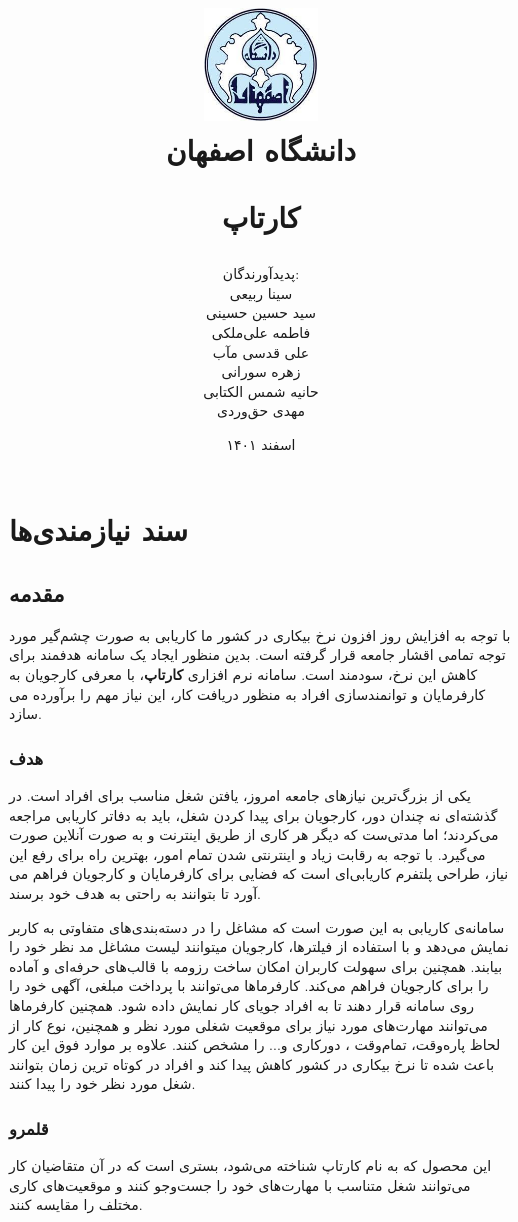 \documentclass[12pt, svgnames]{book}
\title{
	\includegraphics[width=3cm, height=3cm]{logo} \\
	{\large دانشگاه اصفهان} \vspace{3mm}
	
	{\Huge کارتاپ}
}
\author{
	پدید‌آورندگان: \\
	سینا ربیعی \\
	سید حسین حسینی \\
	فاطمه علی‌ملکی \\
	علی قدسی مآب \\
	زهره سورانی \\
	حانیه شمس الکتابی \\
	مهدی حق‌وردی
}
\date{اسفند ۱۴۰۱}
\begin{document}
	\renewcommand{\bibname}{مراجع}
	\maketitle
	\frontmatter
	\tableofcontents
	\mainmatter
	
	\chapter{سند نیازمندی‌ها}
	\section{مقدمه} 
	با توجه به افزایش روز افزون نرخ بیکاری در کشور ما کاریابی به صورت چشم‌گیر مورد توجه تمامی اقشار جامعه قرار گرفته است. بدین منظور ایجاد یک سامانه هدفمند برای کاهش این نرخ، سودمند است. سامانه نرم افزاری \textbf{کارتاپ}، با معرفی کارجویان به کارفرمایان و توانمندسازی افراد به منظور دریافت کار، این نیاز مهم را برآورده می سازد.
	\subsection{هدف}
	یکی از بزرگ‌ترین نیازهای جامعه امروز، یافتن شغل مناسب برای افراد است. در گذشته‌ای نه چندان دور، کارجویان برای پیدا کردن شغل، باید به دفاتر کاریابی مراجعه می‌کردند؛ اما مدتی‌ست که دیگر هر کاری از طریق اینترنت و به صورت آنلاین صورت می‌گیرد. با توجه به رقابت زیاد و اینترنتی شدن تمام امور، بهترین راه برای رفع این نیاز، طراحی پلتفرم کاریابی‌‌ای است که فضایی برای کارفرمایان و کارجویان فراهم می آورد تا بتوانند به راحتی به هدف خود برسند.
	
	سامانه‌ی کاریابی به این صورت است که مشاغل را در دسته‌بندی‌های متفاوتی به کاربر نمایش می‌دهد و با استفاده از فیلترها، کارجویان میتوانند لیست مشاغل مد نظر خود را بیابند. همچنین برای سهولت کاربران امکان ساخت رزومه با قالب‌های حرفه‌ای و آماده را برای کارجویان فراهم می‌کند. کارفرما‌ها می‌توانند با پرداخت مبلغی، آگهی خود را روی سامانه قرار دهند تا به افراد جویای کار نمایش داده شود. همچنین کارفرماها می‌توانند مهارت‌های مورد نیاز برای موقعیت شغلی مورد نظر و همچنین، نوع کار از لحاظ پاره‌وقت، تمام‌وقت ، دورکاری و... را مشخص کنند.
	علاوه بر موارد فوق این کار باعث شده تا نرخ بیکاری در کشور کاهش پیدا کند و افراد در کوتاه ترین زمان بتوانند شغل مورد نظر خود را پیدا کنند.
	
	\subsection{قلمرو} 
	این محصول که به نام کارتاپ شناخته می‌شود، بستری است که در آن متقاضیان کار می‌توانند شغل متناسب با مهارت‌های خود را جست‌وجو کنند و موقعیت‌های کاری مختلف را مقایسه کنند.
	
\end{document}
